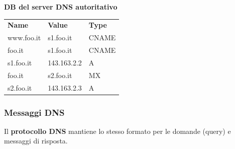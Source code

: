 \bigskip
\textbf{DB del server DNS autoritativo} \newline
\begin{tabular}{lll}
\textbf{Name} & \textbf{Value}     & \textbf{Type}  \\
www.foo.it    & s1.foo.it          & CNAME          \\
foo.it        & s1.foo.it          & CNAME          \\
s1.foo.it     & 143.163.2.2        & A              \\
foo.it        & s2.foo.it          & MX             \\
s2.foo.it     & 143.163.2.3        & A              
\end{tabular}

\subsubsection{Messaggi DNS}
Il \textbf{protocollo DNS} mantiene lo stesso formato per le domande (query) e messaggi di risposta. 

